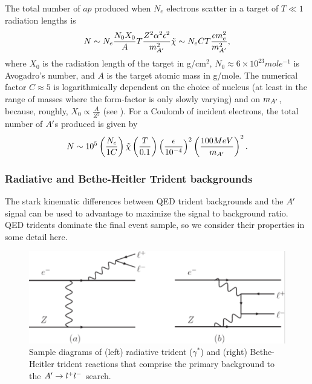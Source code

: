 The total number of $ap$ produced when $N_e$ electrons scatter in a target of $T\ll 1 $ radiation lengths is
\begin{equation}
N\sim N_e\frac{N_0 X_0}{A}T\frac{Z^2\alpha^2\epsilon^2}{m_{A^\prime}^2}\tilde{\chi}\sim N_e C T \frac{\epsilon m_e^2}{m_{A^\prime}^2},
\end{equation}
where $X_0$ is the radiation length of the target in g/cm$^2$, $N_0 \approx 6\times 10^{23} mole^{-1}$ is Avogadro's number, and $A$ is the target atomic mass in g/mole.  The numerical factor $C\approx 5$ is logarithmically dependent on the choice of nucleus (at least in the range of masses where the form-factor is only slowly varying) and on $m_{A^\prime}$, because, roughly, $X_0 \propto \frac{A}{Z^2}$ (see \cite{somerefs}).  For a Coulomb of incident
electrons, the total number of $A^\prime$s produced is given by
\begin{equation}
N\sim 10^5 \left(\frac{N_e}{1 C}\right)\tilde{\chi}\left(\frac{T}{0.1}\right)\left(\frac{\epsilon}{10^{-4}}\right)^2\left(\frac{100 MeV}{m_{A^\prime}}\right)^2.
\end{equation}

\subsubsection{Radiative and Bethe-Heitler Trident backgrounds}
\label{sec:physicsbkgs}
The stark kinematic differences between QED trident backgrounds and the $A^\prime$ signal can be used to advantage to maximize the signal to background ratio. QED tridents dominate the final event sample, so we consider their properties in some detail here.

\begin{figure}
\includegraphics[scale=1]{measurements/rad-bh-diagrams.pdf}
\caption{Sample diagrams of (left) radiative trident ($\gamma^*$) and (right) Bethe-Heitler trident reactions that comprise the primary background to the $A^\prime\rightarrow l^+l^-$  search.}
\label{fig:radbhdiagram}
\end{figure}

